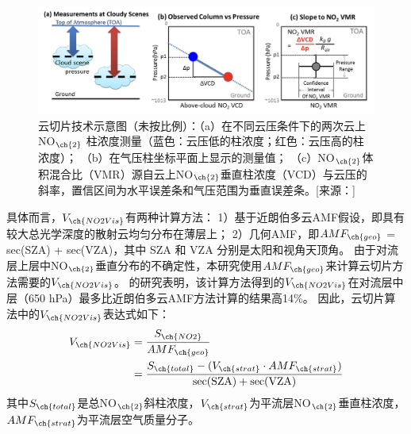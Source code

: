 \begin{figure}[H]
\centering
\includegraphics[width=\textwidth]{./figures/cloud-slicing_schematic.png}
\caption{云切片技术示意图（未按比例）：（a）在不同云压条件下的两次云上NO$_{\ch{2}}$ 柱浓度测量（蓝色：云压低的柱浓度；红色：云压高的柱浓度）；
（b）在气压柱坐标平面上显示的测量值； （c）NO$_{\ch{2}}$体积混合比（VMR）源自云上NO$_{\ch{2}}$垂直柱浓度（VCD）与云压的斜率，置信区间为水平误差条和气压范围为垂直误差条。[来源：\citet{Choi.2014}]\\
}
\label{fig:cloud-slicing_schematic}
\end{figure}

具体而言，$V_{\ch{NO2Vis}}$有两种计算方法：
1）基于近朗伯多云AMF假设，即具有较大总光学深度的散射云均匀分布在薄层上\citep{Choi.2014}；
2）几何AMF，即$AMF_{\ch{geo}}$ = sec(SZA) + sec(VZA)，其中 SZA 和 VZA 分别是太阳和视角天顶角\citep{Marais.2018,Marais.2021}。
由于对流层上层中NO$_{\ch{2}}$垂直分布的不确定性\citep{Travis.2016}，本研究使用$AMF_{\ch{geo}}$来计算云切片方法需要的$V_{\ch{NO2Vis}}$。
\citet{Choi.2014}的研究表明，该计算方法得到的$V_{\ch{NO2Vis}}$在对流层中层（650 hPa）最多比近朗伯多云AMF方法计算的结果高14\%。
因此，云切片算法中的$V_{\ch{NO2Vis}}$表达式如下：
\begin{equation} \label{eq:AMF_geo}
\begin{split}
V_{\ch{NO2Vis}} & = \frac{S_{\ch{NO2}}}{AMF_{\ch{geo}}} \\
             & = \frac{S_{\ch{total}}-(V_{\ch{strat}} \cdot AMF_{\ch{strat}})}{\sec (\mathrm{SZA})+\sec (\mathrm{VZA})}
\end{split}
\end{equation}
其中$S_{\ch{total}}$是总NO$_{\ch{2}}$斜柱浓度，$V_{\ch{strat}}$为平流层NO$_{\ch{2}}$垂直柱浓度，$AMF_{\ch{strat}}$为平流层空气质量分子。


